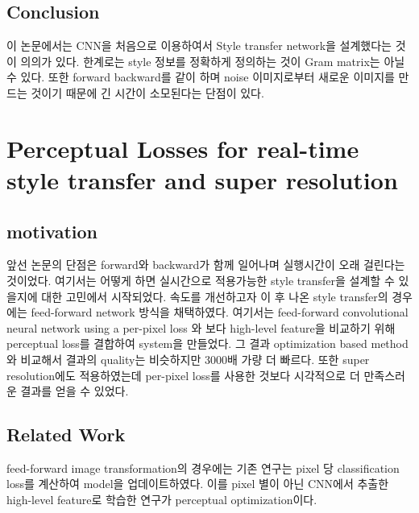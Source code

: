 \documentclass[extendedabs]{bmvc2k}
\begin{document}
\subsection{Conclusion}
\quad 이 논문에서는 CNN을 처음으로 이용하여서 Style transfer network을 설계했다는 것이 의의가 있다. 한계로는 style 정보를 정확하게 정의하는 것이 Gram matrix는 아닐 수 있다.
또한 forward backward를 같이 하며 noise 이미지로부터 새로운 이미지를 만드는 것이기 때문에 긴 시간이 소모된다는 단점이 있다.

\section{Perceptual Losses for real-time style transfer and super resolution \cite{johnson2016perceptual}}
 \subsection{motivation\cite{youtube}}
 \quad 앞선 논문의 단점은 forward와 backward가 함께 일어나며 실행시간이 오래 걸린다는 것이었다. 여기서는 어떻게 하면 실시간으로 적용가능한 style transfer을 설계할 수 있을지에 대한 고민에서 시작되었다.
 속도를 개선하고자 이 후 나온 style transfer의 경우에는 feed-forward network 방식을 채택하였다. 여기서는 feed-forward convolutional neural network using a per-pixel loss 와 보다 high-level feature을 비교하기 위해 perceptual loss를 결합하여 system을 만들었다. 
 그 결과 optimization based method와 비교해서 결과의 quality는 비슷하지만 3000배 가량 더 빠르다. 또한 super resolution에도 적용하였는데 per-pixel loss를 사용한 것보다 시각적으로 더 만족스러운 결과를 얻을 수 있었다.

 \subsection{Related Work}
 \quad feed-forward image transformation의 경우에는 기존 연구는 pixel 당 classification loss를 계산하여 model을 업데이트하였다. 
 이를 pixel 별이 아닌 CNN에서 추출한 high-level feature로 학습한 연구가 perceptual optimization이다.  
 
\end{document}
